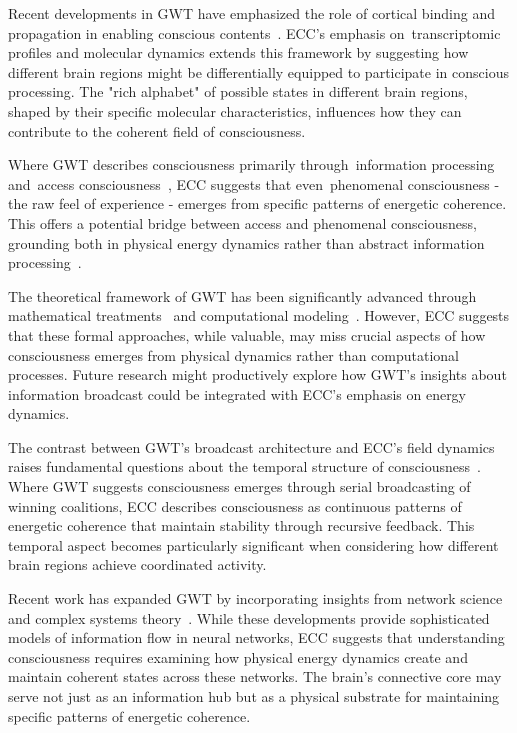 Recent developments in GWT have emphasized the role of cortical binding and propagation in enabling conscious contents~\cite{Baars2013, Shanahan2012}. ECC's emphasis on~transcriptomic profiles and molecular dynamics extends this framework by suggesting how different brain regions might be differentially equipped to participate in conscious processing. The "rich alphabet" of possible states in different brain regions, shaped by their specific molecular characteristics, influences how they can contribute to the coherent field of consciousness.

Where GWT describes consciousness primarily through~information processing and~access consciousness~\cite{Dehaene2014, Block2007}, ECC suggests that even~phenomenal consciousness - the raw feel of experience - emerges from specific patterns of energetic coherence. This offers a potential bridge between access and phenomenal consciousness, grounding both in physical energy dynamics rather than abstract information processing~\cite{Mashour2020, Lamme2006}.

The theoretical framework of GWT has been significantly advanced through mathematical treatments~\cite{Wallace2005} and computational modeling~\cite{Franklin1999, Dehaene2001}. However, ECC suggests that these formal approaches, while valuable, may miss crucial aspects of how consciousness emerges from physical dynamics rather than computational processes. Future research might productively explore how GWT's insights about information broadcast could be integrated with ECC's emphasis on energy dynamics.

The contrast between GWT's broadcast architecture and ECC's field dynamics raises fundamental questions about the temporal structure of consciousness~\cite{Sergent2004, Dennett1992}. Where GWT suggests consciousness emerges through serial broadcasting of winning coalitions, ECC describes consciousness as continuous patterns of energetic coherence that maintain stability through recursive feedback. This temporal aspect becomes particularly significant when considering how different brain regions achieve coordinated activity.

Recent work has expanded GWT by incorporating insights from network science and complex systems theory~\cite{Shanahan2012, breakspear2005dynamics}. While these developments provide sophisticated models of information flow in neural networks, ECC suggests that understanding consciousness requires examining how physical energy dynamics create and maintain coherent states across these networks. The brain's connective core may serve not just as an information hub but as a physical substrate for maintaining specific patterns of energetic coherence.

